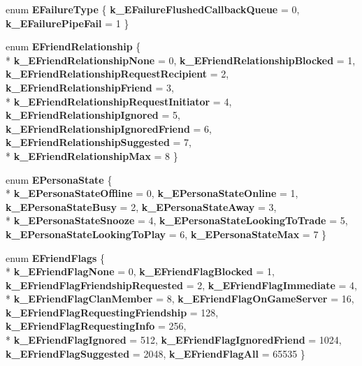 \begin{DoxyCompactItemize}
\item 
\hypertarget{namespaceValve_1_1Steamworks_a9db940d62bb6c76642cee158252002da}{}enum {\bfseries E\+Failure\+Type} \{ {\bfseries k\+\_\+\+E\+Failure\+Flushed\+Callback\+Queue} = 0, 
{\bfseries k\+\_\+\+E\+Failure\+Pipe\+Fail} = 1
 \}\label{namespaceValve_1_1Steamworks_a9db940d62bb6c76642cee158252002da}

\item 
\hypertarget{namespaceValve_1_1Steamworks_a8b7e0e82023fd49d8a424ffac0de57cf}{}enum {\bfseries E\+Friend\+Relationship} \{ \\*
{\bfseries k\+\_\+\+E\+Friend\+Relationship\+None} = 0, 
{\bfseries k\+\_\+\+E\+Friend\+Relationship\+Blocked} = 1, 
{\bfseries k\+\_\+\+E\+Friend\+Relationship\+Request\+Recipient} = 2, 
{\bfseries k\+\_\+\+E\+Friend\+Relationship\+Friend} = 3, 
\\*
{\bfseries k\+\_\+\+E\+Friend\+Relationship\+Request\+Initiator} = 4, 
{\bfseries k\+\_\+\+E\+Friend\+Relationship\+Ignored} = 5, 
{\bfseries k\+\_\+\+E\+Friend\+Relationship\+Ignored\+Friend} = 6, 
{\bfseries k\+\_\+\+E\+Friend\+Relationship\+Suggested} = 7, 
\\*
{\bfseries k\+\_\+\+E\+Friend\+Relationship\+Max} = 8
 \}\label{namespaceValve_1_1Steamworks_a8b7e0e82023fd49d8a424ffac0de57cf}

\item 
\hypertarget{namespaceValve_1_1Steamworks_a3df615cc7a87f65b8acaf8a15b1a2eaa}{}enum {\bfseries E\+Persona\+State} \{ \\*
{\bfseries k\+\_\+\+E\+Persona\+State\+Offline} = 0, 
{\bfseries k\+\_\+\+E\+Persona\+State\+Online} = 1, 
{\bfseries k\+\_\+\+E\+Persona\+State\+Busy} = 2, 
{\bfseries k\+\_\+\+E\+Persona\+State\+Away} = 3, 
\\*
{\bfseries k\+\_\+\+E\+Persona\+State\+Snooze} = 4, 
{\bfseries k\+\_\+\+E\+Persona\+State\+Looking\+To\+Trade} = 5, 
{\bfseries k\+\_\+\+E\+Persona\+State\+Looking\+To\+Play} = 6, 
{\bfseries k\+\_\+\+E\+Persona\+State\+Max} = 7
 \}\label{namespaceValve_1_1Steamworks_a3df615cc7a87f65b8acaf8a15b1a2eaa}

\item 
\hypertarget{namespaceValve_1_1Steamworks_a9c974af1f3d523c18bab95f574957c59}{}enum {\bfseries E\+Friend\+Flags} \{ \\*
{\bfseries k\+\_\+\+E\+Friend\+Flag\+None} = 0, 
{\bfseries k\+\_\+\+E\+Friend\+Flag\+Blocked} = 1, 
{\bfseries k\+\_\+\+E\+Friend\+Flag\+Friendship\+Requested} = 2, 
{\bfseries k\+\_\+\+E\+Friend\+Flag\+Immediate} = 4, 
\\*
{\bfseries k\+\_\+\+E\+Friend\+Flag\+Clan\+Member} = 8, 
{\bfseries k\+\_\+\+E\+Friend\+Flag\+On\+Game\+Server} = 16, 
{\bfseries k\+\_\+\+E\+Friend\+Flag\+Requesting\+Friendship} = 128, 
{\bfseries k\+\_\+\+E\+Friend\+Flag\+Requesting\+Info} = 256, 
\\*
{\bfseries k\+\_\+\+E\+Friend\+Flag\+Ignored} = 512, 
{\bfseries k\+\_\+\+E\+Friend\+Flag\+Ignored\+Friend} = 1024, 
{\bfseries k\+\_\+\+E\+Friend\+Flag\+Suggested} = 2048, 
{\bfseries k\+\_\+\+E\+Friend\+Flag\+All} = 65535
 \}\label{namespaceValve_1_1Steamworks_a9c974af1f3d523c18bab95f574957c59}


\end{DoxyCompactItemize}
